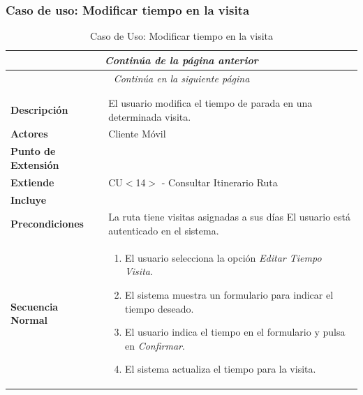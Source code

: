 \subsubsection*{Caso de uso: Modificar tiempo en la visita }
\begin{longtable}{| p{4cm} | p{10cm} |}
\endfirsthead
\multicolumn{2}{c}{\textit{Continúa de la página anterior}}\\[12pt]
\hline
\endhead
\hline
\multicolumn{2}{c}{\textit{Continúa en la siguiente página}} \\
\endfoot
\hline
\caption{Caso de Uso: Modificar tiempo en la visita}\label{fig:1}\\
\endlastfoot


\hline
\multicolumn{2}{|c|}{\textbf{CU$<$18$>$ - Modificar Tiempo en la Visita}} \\

\hline
\textbf{Descripción} &
El usuario modifica el tiempo de parada en una determinada visita.\\

\hline
\textbf{Actores} &
Cliente Móvil\\

\hline
\textbf{Punto de Extensión} &
\\

\hline
\textbf{Extiende} &
CU$<$14$>$ - Consultar Itinerario Ruta
\\

\hline
\textbf{Incluye} &
\\

\hline
\textbf{Precondiciones} &
La ruta tiene visitas asignadas a sus días\newline
El usuario está autenticado en el sistema.\\

\hline
\textbf{Secuencia Normal} &\mbox{}\par\vspace{-\baselineskip}
\begin{enumerate}[leftmargin=0.7cm, topsep=0.1cm]
\item El usuario selecciona la opción \textit{Editar Tiempo Visita}.
\item El sistema muestra un formulario para indicar el tiempo deseado.
\item El usuario indica el tiempo en el formulario y pulsa en \textit{Confirmar}.
\item El sistema actualiza el tiempo para la visita.

\end{enumerate}



\end{longtable}
